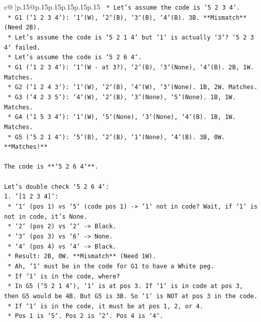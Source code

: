 \documentclass{article}
\begin{document}
{\begin{supertabular}{c@{$\;$}|p{.15\linewidth}@{}p{.15\linewidth}p{.15\linewidth}p{.15\linewidth}p{.15\linewidth}p{.15\linewidth}}
{{{\texttt{    *   Let's assume the code is `5 2 3 4`.} \\
\texttt{        *   G1 (`1 2 3 4`): `1`(W), `2`(B), `3`(B), `4`(B). 3B. **Mismatch** (Need 2B).} \\
\texttt{    *   Let's assume the code is `5 2 1 4` but `1` is actually `3`? `5 2 3 4` failed.} \\
\texttt{    *   Let's assume the code is `5 2 6 4`.} \\
\texttt{        *   G1 (`1 2 3 4`): `1`(W {-} at 3?), `2`(B), `3`(None), `4`(B). 2B, 1W. Matches.} \\
\texttt{        *   G2 (`1 2 4 3`): `1`(W), `2`(B), `4`(W), `3`(None). 1B, 2W. Matches.} \\
\texttt{        *   G3 (`4 2 3 5`): `4`(W), `2`(B), `3`(None), `5`(None). 1B, 1W. Matches.} \\
\texttt{        *   G4 (`1 5 3 4`): `1`(W), `5`(None), `3`(None), `4`(B). 1B, 1W. Matches.} \\
\texttt{        *   G5 (`5 2 1 4`): `5`(B), `2`(B), `1`(None), `4`(B). 3B, 0W. **Matches!**} \\
\\ 
\texttt{The code is **`5 2 6 4`**.} \\
\\ 
\texttt{Let's double check `5 2 6 4`:} \\
\texttt{1.  `{[}1 2 3 4{]}`:} \\
\texttt{    *   `1` (pos 1) vs `5` (code pos 1) {-}> `1` not in code? Wait, if `1` is not in code, it's None.} \\
\texttt{    *   `2` (pos 2) vs `2` {-}> Black.} \\
\texttt{    *   `3` (pos 3) vs `6` {-}> None.} \\
\texttt{    *   `4` (pos 4) vs `4` {-}> Black.} \\
\texttt{    *   Result: 2B, 0W. **Mismatch** (Need 1W).} \\
\texttt{    *   Ah, `1` must be in the code for G1 to have a White peg.} \\
\texttt{    *   If `1` is in the code, where?} \\
\texttt{    *   In G5 (`5 2 1 4`), `1` is at pos 3. If `1` is in code at pos 3, then G5 would be 4B. But G5 is 3B. So `1` is NOT at pos 3 in the code.} \\
\texttt{    *   If `1` is in the code, it must be at pos 1, 2, or 4.} \\
\texttt{    *   Pos 1 is `5`. Pos 2 is `2`. Pos 4 is `4`.} \\
}}}
\end{supertabular}}
\end{document}
